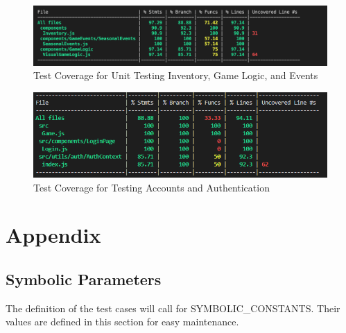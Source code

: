 \documentclass[12pt, titlepage]{article}
\begin{document}
\begin{figure}[H]
\centering
\includegraphics[width=\textwidth]{./Coverage.png}
\caption{Test Coverage for Unit Testing Inventory, Game Logic, and Events}
\label{FigCC1}
\end{figure}

\begin{figure}[H]
\centering
\includegraphics[width=\textwidth]{./Coverage2.png}
\caption{Test Coverage for Testing Accounts and Authentication}
\label{FigCC2}
\end{figure}




\newpage{}
\section{Appendix}
\subsection{Symbolic Parameters}

The definition of the test cases will call for SYMBOLIC\_CONSTANTS.
Their values are defined in this section for easy maintenance.
\end{document}
